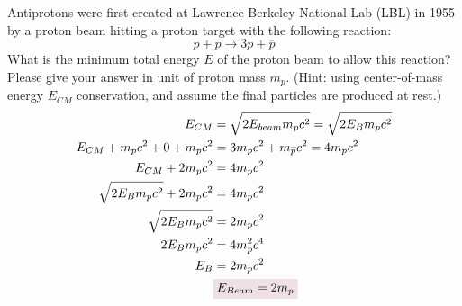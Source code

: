\documentclass{article}
\begin{document}
\newpage
\begin{problem}
    Antiprotons were first created at Lawrence Berkeley National Lab (LBL) in 1955 by a proton beam hitting a proton target with the following reaction:  
    $$p+p\rightarrow 3p+\overline{p}$$  What is the minimum total energy $E$ of the proton beam to allow this reaction? Please give your answer in unit of proton mass $m_p$. (Hint: using center-of-mass energy $E_{CM}$ conservation, and assume the final particles are produced at rest.)
    \answerline
    \begin{align*}
        E_{CM}&=\sqrt{2E_{beam}m_pc^2}=\sqrt{2E_{B}m_pc^2}
        \\
        E_{CM}+m_pc^2+0+m_pc^2&=3m_pc^2+m_{\overline{p}}c^2=4m_pc^2
        \\
        E_{CM}+2m_pc^2&=4m_pc^2
        \\
        \sqrt{2E_{B}m_pc^2}+2m_pc^2&=4m_pc^2
        \\
        \sqrt{2E_{B}m_pc^2}&=2m_pc^2
        \\
        2E_{B}m_pc^2&=4m_p^2c^4
        \\
        E_{B}&=2m_pc^2
        \\
        &\coloredanswer{E_{Beam}=2m_p}
    \end{align*}
\end{problem}
\end{document}

